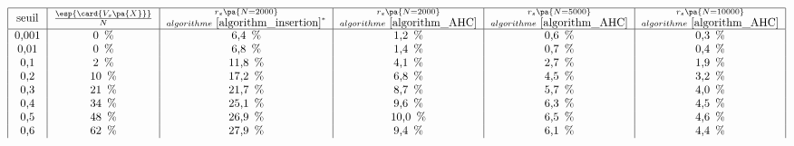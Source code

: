     
                \begin{table}[ht]
                \[
                \begin{tabular}{|c|c|c|c|c|c|} \hline
                seuil &   $\frac{\esp{\card{V_s\pa{X}}}}{N}$ & 
                                $\begin{subarray}{c} r_s\pa{N=2000} \\ 
                                algorithme~\ref{algorithm_insertion}^* \end{subarray}$     &
                                $\begin{subarray}{c} r_s\pa{N=2000} \\ 
                                algorithme~\ref{algorithm_AHC} \end{subarray}$                             &
                                $\begin{subarray}{c} r_s\pa{N=5000} \\ 
                                algorithme~\ref{algorithm_AHC} \end{subarray}$                             &
                                $\begin{subarray}{c} r_s\pa{N=10000} \\ 
                                algorithme~\ref{algorithm_AHC} \end{subarray}$         \\ \hline
                0,001        &        0 \,\%   &      6,4 \,\%   &      1,2 \,\%  & 0,6  \,\% &  0,3 \,\% \\ %
                0,01        &        0 \,\%   &      6,8 \,\%   &      1,4 \,\%  & 0,7  \,\% &  0,4 \,\% \\ %
                0,1            &        2 \,\%   &      11,8 \,\%  &      4,1 \,\%  & 2,7  \,\% &  1,9 \,\% \\ %
                0,2            &        10 \,\%  &      17,2 \,\%  &      6,8 \,\%  & 4,5  \,\% &  3,2 \,\% \\ %
                0,3            &        21 \,\%  &      21,7 \,\%  &      8,7 \,\%  & 5,7  \,\% &  4,0 \,\% \\ %
                0,4            &        34 \,\%  &      25,1 \,\%  &      9,6 \,\%  & 6,3  \,\% &  4,5 \,\% \\ %
                0,5            &        48 \,\%  &      26,9 \,\%  &      10,0 \,\% & 6,5  \,\% &  4,6 \,\% \\ %
                0,6            &        62 \,\%  &      27,9 \,\%  &      9,4 \,\%  & 6,1  \,\% &  4,4 \,\% \\ %

\end{tabular}\]
\end{table}
